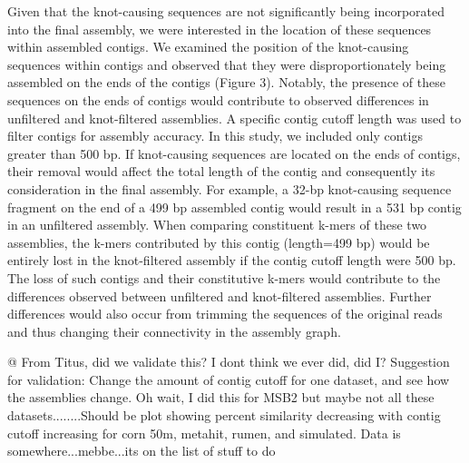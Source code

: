 \documentclass[11pt]{article} %
\begin{document}
Given that the knot-causing sequences are not significantly being incorporated into the final assembly, we were interested in the location of these sequences within assembled contigs.  We examined the position of the knot-causing sequences within contigs and observed that they were disproportionately being assembled on the ends of the contigs (Figure 3).  Notably, the presence of these sequences on the ends of contigs would contribute to observed differences in unfiltered and knot-filtered assemblies.  A specific contig cutoff length was used to filter contigs for assembly accuracy.  In this study, we included only contigs greater than 500 bp.  If knot-causing sequences are located on the ends of contigs, their removal would affect the total length of the contig and consequently its consideration in the final assembly.  For example, a 32-bp knot-causing sequence fragment on the end of a 499 bp assembled contig would result in a 531 bp contig in an unfiltered assembly.  When comparing constituent k-mers of these two assemblies, the k-mers contributed by this contig (length=499 bp) would be entirely lost in the knot-filtered assembly if the contig cutoff length were 500 bp.  The loss of such contigs and their constitutive k-mers would contribute to the differences observed between unfiltered and knot-filtered assemblies.  Further differences would also occur from trimming the sequences of the original reads and thus changing their connectivity in the assembly graph.  

@ From Titus, did we validate this?  I dont think we ever did, did I?  Suggestion for validation:  Change the amount of contig cutoff for one dataset, and see how the assemblies change.  Oh wait, I did this for MSB2 but maybe not all these datasets........Should be plot showing percent similarity decreasing with contig cutoff increasing for corn 50m, metahit, rumen, and simulated.   Data is somewhere...mebbe...its on the list of stuff to do
\end{document}
